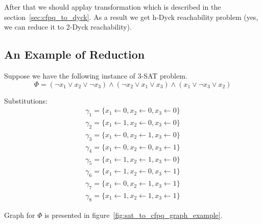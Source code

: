 After that we should applay transformation which is described in the section~\ref{sec:cfpq_to_dyck}. 
As a result we get h-Dyck reachability problem (yes, we can reduce it to 2-Dyck reachability).

\subsection{An Example of Reduction}

Suppose we have the following instance of 3-SAT problem. 
$$
\Phi = (\neg x_1 \vee x_2 \vee \neg x_3) \wedge (\neg x_2 \vee x_1 \vee x_3) \wedge (x_1 \vee \neg x_3 \vee x_2)
$$

Substitutions:
\begin{align*}
\gamma_1 = \{x_1 \leftarrow 0, x_2 \leftarrow 0, x_3 \leftarrow 0\} \\
\gamma_2 = \{x_1 \leftarrow 1, x_2 \leftarrow 0, x_3 \leftarrow 0\} \\
\gamma_3 = \{x_1 \leftarrow 0, x_2 \leftarrow 1, x_3 \leftarrow 0\} \\
\gamma_4 = \{x_1 \leftarrow 0, x_2 \leftarrow 0, x_3 \leftarrow 1\} \\
\gamma_5 = \{x_1 \leftarrow 1, x_2 \leftarrow 1, x_3 \leftarrow 0\} \\
\gamma_6 = \{x_1 \leftarrow 1, x_2 \leftarrow 0, x_3 \leftarrow 1\} \\
\gamma_7 = \{x_1 \leftarrow 0, x_2 \leftarrow 1, x_3 \leftarrow 1\} \\
\gamma_8 = \{x_1 \leftarrow 1, x_2 \leftarrow 1, x_3 \leftarrow 1\} 
\end{align*}

Graph for $\Phi$ is presented in figure~\ref{fig:sat_to_cfpq_graph_example}.


